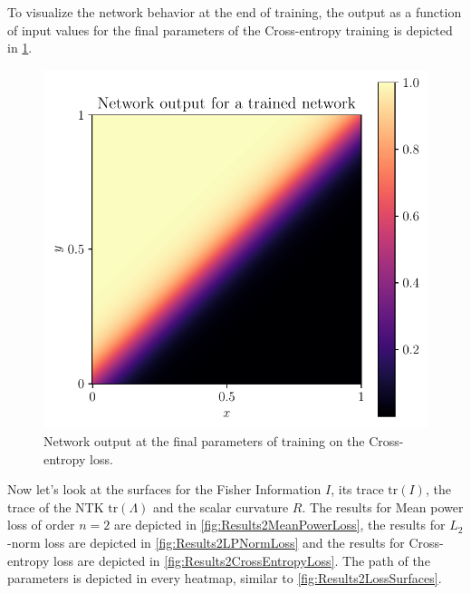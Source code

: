 To visualize the network behavior at the end of training, the output as a function of input values for the final parameters of the Cross-entropy training is depicted in \cref{fig:Results2NetworkOutput}.
\begin{figure}
	\centering
	\includegraphics{Experiment2/plots/Network_output.pdf}
	\caption{Network output at the final parameters of training on the Cross-entropy loss.}
	\label{fig:Results2NetworkOutput}	
\end{figure}
Now let's look at the surfaces for the Fisher Information $I$, its trace $\mathrm{tr}(I)$, the trace of the NTK $\mathrm{tr}(\Lambda)$ and the scalar curvature $R$. The results for Mean power loss of order $n=2$ are depicted in \cref{fig:Results2MeanPowerLoss}, the results for $L_2$-norm loss are depicted in \cref{fig:Results2LPNormLoss} and the results for Cross-entropy loss are depicted in \cref{fig:Results2CrossEntropyLoss}. The path of the parameters is depicted in every heatmap, similar to \cref{fig:Results2LossSurfaces}.\\
